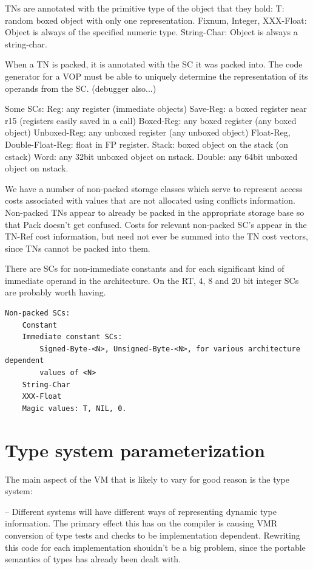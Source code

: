 TNs are annotated with the primitive type of the object that they hold:
    T: random boxed object with only one representation.
    Fixnum, Integer, XXX-Float: Object is always of the specified numeric type.
    String-Char: Object is always a string-char.

When a TN is packed, it is annotated with the SC it was packed into.  The code
generator for a VOP must be able to uniquely determine the representation of
its operands from the SC. (debugger also...)

Some SCs:
    Reg: any register (immediate objects)
    Save-Reg: a boxed register near r15 (registers easily saved in a call)
    Boxed-Reg: any boxed register (any boxed object)
    Unboxed-Reg: any unboxed register (any unboxed object)
    Float-Reg, Double-Float-Reg: float in FP register.
    Stack: boxed object on the stack (on cstack)
    Word: any 32bit unboxed object on nstack.
    Double: any 64bit unboxed object on nstack.

We have a number of non-packed storage classes which serve to represent access
costs associated with values that are not allocated using conflicts
information.  Non-packed TNs appear to already be packed in the appropriate
storage base so that Pack doesn't get confused.  Costs for relevant non-packed
SC's appear in the TN-Ref cost information, but need not ever be summed into
the TN cost vectors, since TNs cannot be packed into them.

There are SCs for non-immediate constants and for each significant kind of
immediate operand in the architecture.  On the RT, 4, 8 and 20 bit integer SCs
are probably worth having.

\begin{verbatim}
Non-packed SCs:
    Constant
    Immediate constant SCs:
        Signed-Byte-<N>, Unsigned-Byte-<N>, for various architecture dependent
	    values of <N>
	String-Char
	XXX-Float
	Magic values: T, NIL, 0.
\end{verbatim}
\chapter{Type system parameterization}

The main aspect of the VM that is likely to vary for good reason is the type
system:

 -- Different systems will have different ways of representing dynamic type
    information.  The primary effect this has on the compiler is causing VMR
    conversion of type tests and checks to be implementation dependent.
    Rewriting this code for each implementation shouldn't be a big problem,
    since the portable semantics of types has already been dealt with.

